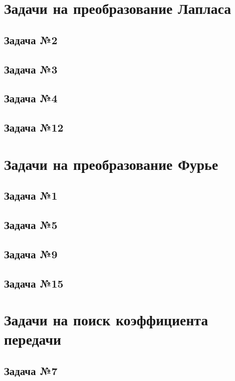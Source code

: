 \documentclass[a4paper,14pt]{extarticle}
\theoremstyle{definition}
\begin{document}
\section{Задачи на преобразование Лапласа}
\subsection{Задача №2}  \newpage
\subsection{Задача №3}  \newpage
\subsection{Задача №4}  \newpage
\subsection{Задача №12}  \newpage

\section{Задачи на преобразование Фурье}
\subsection{Задача №1}  \newpage
\subsection{Задача №5}  \newpage
\subsection{Задача №9}  \newpage
\subsection{Задача №15}   \newpage

\section{Задачи на поиск коэффициента передачи}
\subsection{Задача №7}  \newpage
\end{document}
